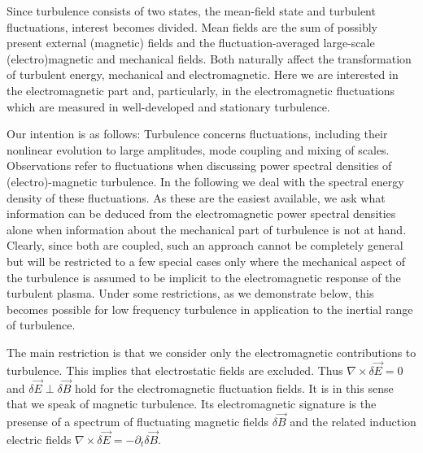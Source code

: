 \documentclass[ ]{copernicus2}
\begin{document}
{Since turbulence consists of two states, the mean-field state and turbulent fluctuations, interest becomes divided. Mean fields are the sum of possibly present external (magnetic) fields and the fluctuation-averaged large-scale (electro)magnetic and mechanical fields. Both naturally affect the transformation of turbulent energy, mechanical and electromagnetic. Here we are interested in the electromagnetic part and, particularly, in the electromagnetic fluctuations which are measured in well-developed and stationary turbulence. 

{Our intention is as follows: Turbulence concerns fluctuations, including their nonlinear evolution to large amplitudes, mode coupling and mixing of scales. Observations refer to fluctuations when discussing power spectral densities of (electro)-magnetic turbulence. In the following we deal with the spectral energy density of these fluctuations. As these are the easiest available, we ask what information can be deduced from the electromagnetic power spectral densities alone when information about the mechanical part of turbulence is not at hand. Clearly, since both are coupled, such an approach cannot be completely general but will be restricted to a few special cases only where the mechanical aspect of the turbulence is assumed to be implicit to the electromagnetic response of the turbulent plasma. Under some restrictions, as we demonstrate below, this becomes possible for low frequency turbulence in application to the inertial range of turbulence.}

{The main restriction is that we consider only the electromagnetic contributions to turbulence. This implies that electrostatic fields are excluded. Thus $\nabla\times\delta\vec{E}=0$ and $\delta\vec{E}\perp\delta\vec{B}$ hold for the electromagnetic fluctuation fields. It is in this sense that we speak of magnetic turbulence. Its electromagnetic signature is the presense of a spectrum of fluctuating magnetic fields $\delta\vec{B}$ and the related induction electric fields $\nabla\times\delta\vec{E}=-\partial_t\delta\vec{B}$.}

}
\end{document}
